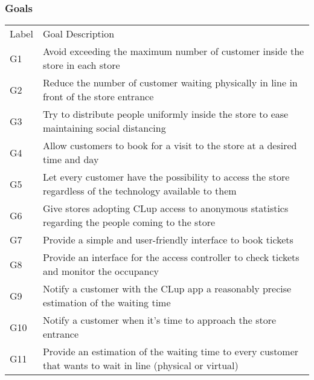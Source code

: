 \vfill

\pagebreak

\subsubsection{Goals}
\renewcommand{\arraystretch}{1.4}
\begin{tabular}{C{1cm}L{14.1cm}}
      Label & Goal Description                                                                                                                                                               \\
      G1    & Avoid exceeding the maximum number of customer inside the store in each store                                                                                            \\
      G2    & Reduce the number of customer waiting physically in line in front of the store entrance                                                                                \\
      G3    & Try to distribute people uniformly inside the store to ease maintaining social distancing                                                                                      \\
      G4    & Allow customers to book for a visit to the store at a desired time and day                                   \\
      G5    & Let every customer have the possibility to access the store regardless of the technology available to them                                                                      \\
      G6    & Give stores adopting CLup access to anonymous statistics regarding the people coming to the store                                                                               \\
      G7    & Provide a simple and user-friendly interface to book tickets                                                                                                                   \\
      G8    & Provide an interface for the access controller to check tickets and monitor the occupancy                                                                                      \\
      G9    & Notify a customer with the CLup app a reasonably precise estimation of the waiting time  \\
      G10   & Notify a customer when it's time to approach the store entrance                                                                                                                \\
      G11   & Provide an estimation of the waiting time to every customer that wants to wait in line (physical or virtual)                                                                   \\
\end{tabular}

